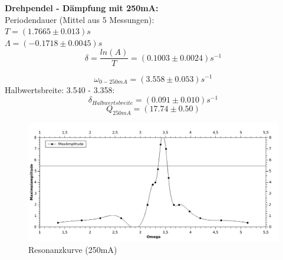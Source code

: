 \documentclass[12pt,a4paper]{article}
\begin{document}
\begin{multicols}{2}
\noindent \textbf{Drehpendel - Dämpfung mit 250mA:}\\
Periodendauer (Mittel aus 5 Messungen):\\
$T = (1.7665 \pm 0.013)s$\\
$\Lambda = (-0.1718 \pm 0.0045)s$
$$\delta = \frac{ln(A)}{T} = (0.1003 \pm 0.0024)s^{-1}$$

$$\omega_{0 - 250mA}=(3.558 \pm 0.053)s^{-1}$$
Halbwertsbreite: 3.540 - 3.358:\\
$$\delta_{Halbwertsbreite} = (0.091 \pm 0.010)s^{-1}$$
$$Q_{250mA}=(17.74 \pm 0.50)$$


\end{multicols}
\begin{figure}[H]
	\centering
	\includegraphics[scale=1.8]{./figure/Messung1_Resonanzkurve_250mA.png}
	\caption{Resonanzkurve (250mA)}
	\label{fig:resonanzkurve_250mA}
\end{figure}
\end{document}
